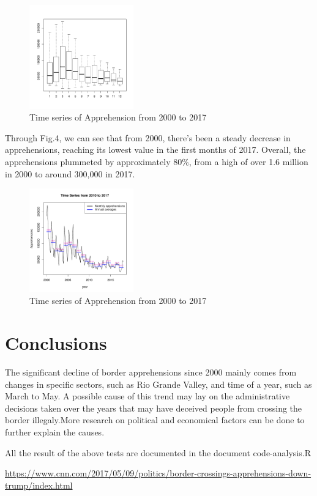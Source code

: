 \documentclass[journal, a4paper]{IEEEtran}
\begin{document}
\begin{figure}[!hbt]
  \begin{center}

{

  \includegraphics[width=0.4\textwidth]{pdf_template3-fig4}
  \caption{Time series of Apprehension from 2000 to 2017}
}

  \end{center}
\end{figure} 

Through Fig.4, we can see that from 2000, there's been a steady decrease in apprehensions, reaching its lowest value in  the first months of 2017. Overall, the apprehensions plummeted by approximately 80\%, from a high of over 1.6 million in 2000 to around 300,000 in 2017.
\begin{figure}[!hbt]
  \begin{center}

{

  \includegraphics[width=0.4\textwidth]{pdf_template3-fig3}
  \caption{Time series of Apprehension from 2000 to 2017}
}

  \end{center}
\end{figure} 



	
	\section{Conclusions}
	The significant decline of border apprehensions since 2000 mainly comes from changes in specific sectors, such as Rio Grande Valley, and time of a year, such as March to May. A possible cause of this trend may lay on the administrative decisions taken over the years that may have deceived people from crossing the border illegaly.More research on political and economical factors can be done to further explain the causes.




	\begin{thebibliography}{5}
		
		
		
  	 All the result of the above tests are documented in the document code-analysis.R
	
     \url{https://www.cnn.com/2017/05/09/politics/border-crossings-apprehensions-down-trump/index.html}
		
	\end{thebibliography}
		
	
\end{document}
